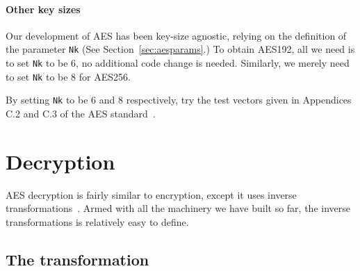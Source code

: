 

\paragraph*{Other key sizes} Our development of AES has been key-size
agnostic, relying on the definition of the parameter {\tt Nk} (See
Section~\ref{sec:aesparams}.)  To obtain AES192, all we need is to set
{\tt Nk} to be 6, no additional code change is needed.  Similarly, we
merely need to set {\tt Nk} to be 8 for AES256.

\begin{Exercise}\label{ex:aes192}
  By setting {\tt Nk} to be 6 and 8 respectively, try the test vectors
  given in Appendices C.2 and C.3 of the AES\indAES
  standard~\cite{aes}.
\end{Exercise}

\section{Decryption}
\label{sec:aesdecryption}

AES decryption is fairly similar to encryption, except it uses inverse
transformations~\cite[Figure 12, Section 5.3]{aes}. Armed with all the
machinery we have built so far, the inverse transformations is
relatively easy to define.

\subsection{The {} transformation}
\label{sec:ttfam-invs-transf}

